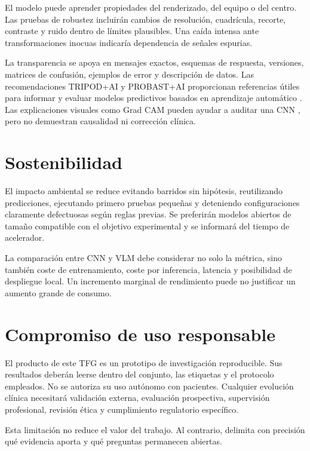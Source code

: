 El modelo puede aprender propiedades del renderizado, del equipo o del centro. Las pruebas de robustez incluirán cambios de resolución, cuadrícula, recorte, contraste y ruido dentro de límites plausibles. Una caída intensa ante transformaciones inocuas indicaría dependencia de señales espurias.

La transparencia se apoya en mensajes exactos, esquemas de respuesta, versiones, matrices de confusión, ejemplos de error y descripción de datos. Las recomendaciones TRIPOD+AI y PROBAST+AI proporcionan referencias útiles para informar y evaluar modelos predictivos basados en aprendizaje automático \cite{collins2024tripodai,moons2025probastai}. Las explicaciones visuales como Grad CAM pueden ayudar a auditar una CNN \cite{selvaraju2017}, pero no demuestran causalidad ni corrección clínica.

\section{Sostenibilidad}

El impacto ambiental se reduce evitando barridos sin hipótesis, reutilizando predicciones, ejecutando primero pruebas pequeñas y deteniendo configuraciones claramente defectuosas según reglas previas. Se preferirán modelos abiertos de tamaño compatible con el objetivo experimental y se informará del tiempo de acelerador.

La comparación entre CNN y VLM debe considerar no solo la métrica, sino también coste de entrenamiento, coste por inferencia, latencia y posibilidad de despliegue local. Un incremento marginal de rendimiento puede no justificar un aumento grande de consumo.

\section{Compromiso de uso responsable}

El producto de este TFG es un prototipo de investigación reproducible. Sus resultados deberán leerse dentro del conjunto, las etiquetas y el protocolo empleados. No se autoriza su uso autónomo con pacientes. Cualquier evolución clínica necesitará validación externa, evaluación prospectiva, supervisión profesional, revisión ética y cumplimiento regulatorio específico.

Esta limitación no reduce el valor del trabajo. Al contrario, delimita con precisión qué evidencia aporta y qué preguntas permanecen abiertas.
